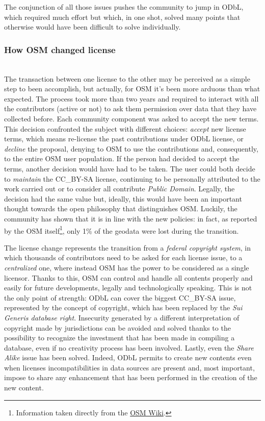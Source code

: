 The conjunction of all those issues pushes the community to jump in ODbL, which required much effort but which, in one shot, solved many points that otherwise would have been difficult to solve individually.

\subsubsection{How OSM changed license}~\\
The transaction between one license to the other may be perceived as a simple step to been accomplish, but actually, for OSM it's been more arduous than what expected.
The process took more than two years and required to interact with all the contributors (active or not) to ask them permission over data that they have collected before.
Each community component was asked to accept the new terms. This decision confronted the subject with different choices: \textit{accept} new license terms, which means re-license the past contributions under ODbL license, or \textit{decline} the proposal, denying to OSM to use the contributions and, consequently, to the entire OSM user population.
If the person had decided to accept the terms, another decision would have had to be taken. The user could both decide to \textit{maintain} the CC\_BY-SA license, continuing to be personally attributed to the work carried out or to consider all contribute \textit{Public Domain}. Legally, the decision had the same value but, ideally, this would have been an important thought towards the open philosophy that distinguishes OSM. Luckily, the community has shown that it is in line with the new policies: in fact, as reported by the OSM itself\footnote{Information taken directly from the \href{https://wiki.openstreetmap.org/wiki/Open_Database_License}{OSM Wiki}.}, only 1\% of the geodata were lost during the transition.

The license change represents the transition from a \textit{federal copyright system}, in which thousands of contributors need to be asked for each license issue, to a \textit{centralized} one, where instead OSM has the power to be considered as a single licensor. Thanks to this, OSM can control and handle all contents properly and easily for future developments, legally and technologically speaking. 
This is not the only point of strength: ODbL can cover the biggest CC\_BY-SA issue, represented by the concept of copyright, which has been replaced by the \textit{Sui Generis database right}\cite{ginsburg1997copyright}. Insecurity generated by a different interpretation of copyright made by jurisdictions can be avoided and solved thanks to the possibility to recognize the investment that has been made in compiling a database, even if no creativity process has been involved.
Lastly, even the \textit{Share Alike} issue has been solved. Indeed, ODbL permits to create new contents even when licenses incompatibilities in data sources are present and, most important, impose to share any enhancement that has been performed in the creation of the new content.


